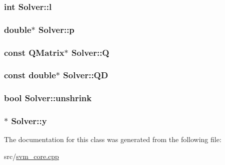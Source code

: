 \subsubsection[{l}]{\setlength{\rightskip}{0pt plus 5cm}int Solver\+::l\hspace{0.3cm}{\ttfamily [protected]}}\hypertarget{classSolver_a88832d45b6de977b1cbb2afd4c0e494c}{}\label{classSolver_a88832d45b6de977b1cbb2afd4c0e494c}
\subsubsection[{p}]{\setlength{\rightskip}{0pt plus 5cm}double$\ast$ Solver\+::p\hspace{0.3cm}{\ttfamily [protected]}}\hypertarget{classSolver_a882cce072f56679880d409e3e73f7ae8}{}\label{classSolver_a882cce072f56679880d409e3e73f7ae8}
\subsubsection[{Q}]{\setlength{\rightskip}{0pt plus 5cm}const {\bf Q\+Matrix}$\ast$ Solver\+::Q\hspace{0.3cm}{\ttfamily [protected]}}\hypertarget{classSolver_a2d3461718f0570bdc47f5dfb31d61e0a}{}\label{classSolver_a2d3461718f0570bdc47f5dfb31d61e0a}
\subsubsection[{QD}]{\setlength{\rightskip}{0pt plus 5cm}const double$\ast$ Solver\+::\+QD\hspace{0.3cm}{\ttfamily [protected]}}\hypertarget{classSolver_a7c7b7b1207983543855165e8eb249f2a}{}\label{classSolver_a7c7b7b1207983543855165e8eb249f2a}
\subsubsection[{unshrink}]{\setlength{\rightskip}{0pt plus 5cm}bool Solver\+::unshrink\hspace{0.3cm}{\ttfamily [protected]}}\hypertarget{classSolver_a62ded1c184aeb28f8dee04eb4a10530a}{}\label{classSolver_a62ded1c184aeb28f8dee04eb4a10530a}
\subsubsection[{y}]{$\ast$ Solver\+::y\hspace{0.3cm}{\ttfamily [protected]}}\hypertarget{classSolver_a3acc1043d06dedf87f054ff3eea5c426}{}\label{classSolver_a3acc1043d06dedf87f054ff3eea5c426}


The documentation for this class was generated from the following file\+:\begin{DoxyCompactItemize}
\item 
src/\hyperlink{svm__core_8cpp}{svm\+\_\+core.\+cpp}\end{DoxyCompactItemize}
